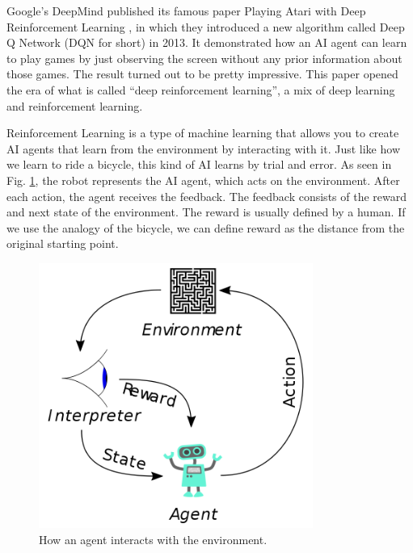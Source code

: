
Google's DeepMind published its famous paper Playing Atari with Deep Reinforcement Learning \cite {Mnih2015AtariNature}, in which they introduced a new algorithm called Deep Q Network (DQN for short) in 2013. It demonstrated how an AI agent can learn to play games by just observing the screen without any prior information about those games. The result turned out to be pretty impressive. This paper opened the era of what is called ``deep reinforcement learning'', a mix of deep learning and reinforcement learning.

Reinforcement Learning is a type of machine learning that allows you to create AI agents that learn from the environment by interacting with it. Just like how we learn to ride a bicycle, this kind of AI learns by trial and error. As seen in Fig. \ref {fig:deepmind}, the robot represents the AI agent, which acts on the environment. After each action, the agent receives the feedback. The feedback consists of the reward and next state of the environment. The reward is usually defined by a human. If we use the analogy of the bicycle, we can define reward as the distance from the original starting point.

\begin{figure}[h] 
\centering
\includegraphics[width=0.8\textwidth]{figs/ch1/Reinforcement_learning_diagram}
\caption{How an agent interacts with the environment.}
\label{fig:deepmind}
\end{figure}


